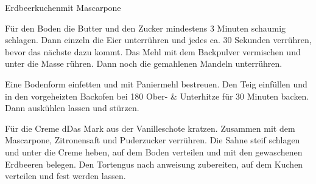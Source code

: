\begin{recipe}{Erdbeerkuchen}{mit Mascarpone}
  \label{Erdbeerkuchen}


  \steps

  Für den Boden die Butter und den Zucker mindestens 3 Minuten schaumig
  schlagen. Dann einzeln die Eier unterrühren und jedes ca. 30 Sekunden
  verrühren, bevor das nächste dazu kommt. Das Mehl mit dem Backpulver
  vermischen und unter die Masse rühren. Dann noch die gemahlenen Mandeln
  unterrühren.

  Eine Bodenform einfetten und mit Paniermehl bestreuen. Den Teig einfüllen und
  in den vorgeheizten Backofen bei 180 \celsius Ober- \& Unterhitze für 30 Minuten
  backen. Dann auskühlen lassen und stürzen.

  Für die Creme dDas Mark aus der Vanilleschote kratzen. Zusammen mit dem
  Mascarpone, Zitronensaft und Puderzucker verrühren. Die Sahne steif schlagen
  und unter die Creme heben, auf dem Boden verteilen und mit den gewaschenen
  Erdbeeren belegen. Den Tortengus nach anweisung zubereiten, auf dem Kuchen
  verteilen und fest werden lassen.

\end{recipe}
